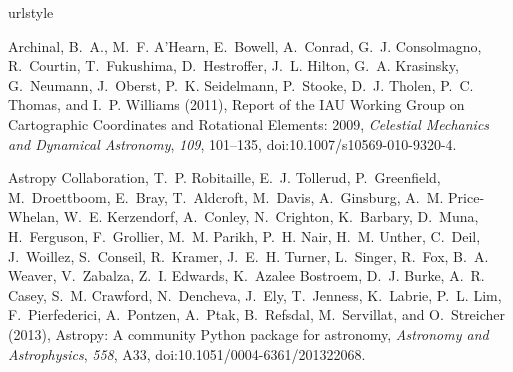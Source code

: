 \DIFdelbegin %
\DIFdelend \DIFaddbegin \begin{thebibliography}{22}
\DIFaddend \providecommand{\natexlab}[1]{#1}
\expandafter\ifx\csname urlstyle\endcsname\relax
  \providecommand{\doi}[1]{doi:\discretionary{}{}{}#1}\else
  \providecommand{\doi}{doi:\discretionary{}{}{}\begingroup
  \urlstyle{rm}\Url}\fi

{Archinal}, B.~A., M.~F. {A'Hearn}, E.~{Bowell}, A.~{Conrad}, G.~J.
  {Consolmagno}, R.~{Courtin}, T.~{Fukushima}, D.~{Hestroffer}, J.~L. {Hilton},
  G.~A. {Krasinsky}, G.~{Neumann}, J.~{Oberst}, P.~K. {Seidelmann},
  P.~{Stooke}, D.~J. {Tholen}, P.~C. {Thomas}, and I.~P. {Williams} (2011),
  {Report of the IAU Working Group on Cartographic Coordinates and Rotational
  Elements: 2009}, \textit{Celestial Mechanics and Dynamical Astronomy},
  \textit{109}, 101--135, \doi{10.1007/s10569-010-9320-4}.

{Astropy Collaboration}, T.~P. {Robitaille}, E.~J. {Tollerud}, P.~{Greenfield},
  M.~{Droettboom}, E.~{Bray}, T.~{Aldcroft}, M.~{Davis}, A.~{Ginsburg}, A.~M.
  {Price-Whelan}, W.~E. {Kerzendorf}, A.~{Conley}, N.~{Crighton}, K.~{Barbary},
  D.~{Muna}, H.~{Ferguson}, F.~{Grollier}, M.~M. {Parikh}, P.~H. {Nair}, H.~M.
  {Unther}, C.~{Deil}, J.~{Woillez}, S.~{Conseil}, R.~{Kramer}, J.~E.~H.
  {Turner}, L.~{Singer}, R.~{Fox}, B.~A. {Weaver}, V.~{Zabalza}, Z.~I.
  {Edwards}, K.~{Azalee Bostroem}, D.~J. {Burke}, A.~R. {Casey}, S.~M.
  {Crawford}, N.~{Dencheva}, J.~{Ely}, T.~{Jenness}, K.~{Labrie}, P.~L. {Lim},
  F.~{Pierfederici}, A.~{Pontzen}, A.~{Ptak}, B.~{Refsdal}, M.~{Servillat}, and
  O.~{Streicher} (2013), {Astropy: A community Python package for astronomy},
  \textit{Astronomy and Astrophysics}, \textit{558}, A33,
  \doi{10.1051/0004-6361/201322068}.


\end{thebibliography}
